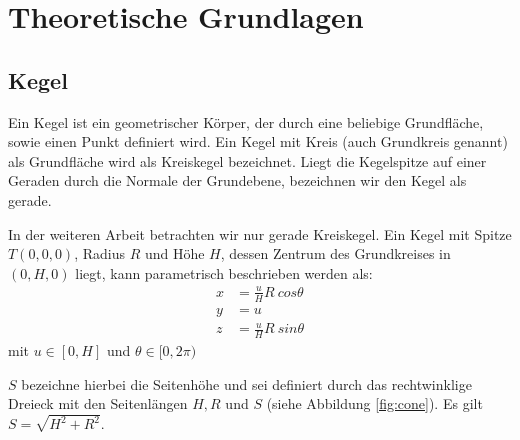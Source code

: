 \chapter{Theoretische Grundlagen}
\label{ch:theory}

%


\section{Kegel}
\label{s:cone}

\begin{definition}[Kegel]
	Ein Kegel ist ein geometrischer Körper, der durch eine beliebige Grundfläche, sowie einen Punkt definiert wird.
	Ein Kegel mit Kreis (auch Grundkreis genannt) als Grundfläche wird als Kreiskegel bezeichnet. Liegt die Kegelspitze auf einer Geraden durch die Normale der Grundebene, bezeichnen wir den Kegel als gerade.
\end{definition}

In der weiteren Arbeit betrachten wir nur gerade Kreiskegel. Ein Kegel mit Spitze $T(0,0,0)$, Radius $R$ und Höhe $H$, dessen Zentrum des Grundkreises in $(0,H,0)$ liegt, kann parametrisch beschrieben werden als:
\begin{equation} \label{eq:paramCone}
\begin{aligned}
x &= \frac{u}{H} R~cos \theta \\
y &= u \\
z &= \frac{u}{H} R~sin \theta
\end{aligned}
\end{equation} %
mit $u\in [0, H]$ und $\theta \in [0, 2\pi)$

$S$ bezeichne hierbei die Seitenhöhe und sei definiert durch das rechtwinklige Dreieck mit den Seitenlängen $H,R$ und $S$ (siehe Abbildung \ref{fig:cone}). Es gilt $S = \sqrt{H^2 + R^2}$.

